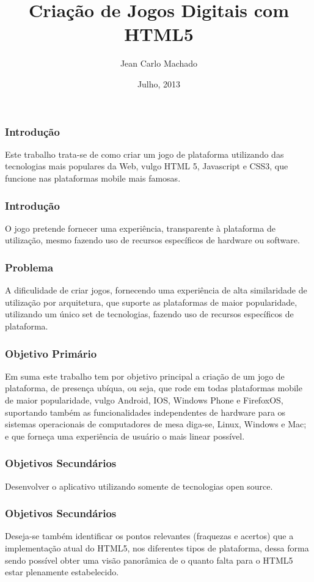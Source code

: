 \documentclass{beamer}
\title{Criação de Jogos Digitais com HTML5}
\author{Jean Carlo Machado}
\institute{Oritentador: Rogério Tessari}
\date{Julho, 2013}
\begin{document}
\maketitle

\begin{frame}
\frametitle{Introdução}

Este trabalho trata-se de como criar um jogo de plataforma utilizando das tecnologias mais populares da Web, vulgo HTML 5, Javascript e CSS3, que funcione nas plataformas mobile mais famosas.

\end{frame}

\begin{frame}
\frametitle{Introdução}

O jogo pretende fornecer uma experiência, transparente à plataforma de utilização, mesmo fazendo uso de recursos específicos de hardware ou software. 

\end{frame}

\begin{frame}
\frametitle{Problema}

A dificulidade de criar jogos, fornecendo uma experiência de alta similaridade de utilização por arquitetura, que suporte as plataformas de maior popularidade, utilizando um único set de tecnologias, fazendo uso de  recursos específicos de plataforma.

\end{frame}

\begin{frame}
\frametitle{Objetivo Primário}

Em suma este trabalho tem por objetivo principal a criação de um jogo de plataforma, de presença ubíqua, ou seja, que rode em todas plataformas mobile de maior popularidade, vulgo Android, IOS, Windows Phone e FirefoxOS, suportando também as funcionalidades independentes de hardware para os sistemas operacionais de computadores de mesa diga-se,  Linux, Windows e Mac; e que forneça uma experiência de usuário o mais linear possível.  

\end{frame}


\begin{frame}
\frametitle{Objetivos Secundários}
 Desenvolver o aplicativo utilizando somente de tecnologias open source.
\end{frame}


\begin{frame}
\frametitle{Objetivos Secundários}
Deseja-se também identificar os pontos relevantes (fraquezas e acertos) que a implementação atual do HTML5, nos diferentes tipos de plataforma, dessa forma sendo possível obter uma visão panorâmica de o quanto falta para o HTML5 estar plenamente estabelecido.
\end{frame}
\end{document}
